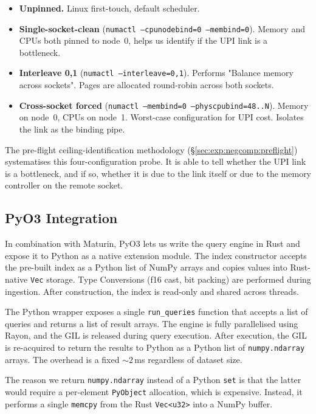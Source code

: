 \begin{itemize}
    \item \textbf{Unpinned.} Linux first-touch, default scheduler.
    \item \textbf{Single-socket-clean} (\texttt{numactl --cpunodebind=0 --membind=0}). Memory and CPUs both pinned to node~0, helps us identify if the UPI link is a bottleneck.
    \item \textbf{Interleave 0,1} (\texttt{numactl --interleave=0,1}). Performs "Balance memory across sockets". Pages are allocated round-robin across both sockets. 
    \item \textbf{Cross-socket forced} (\texttt{numactl --membind=0 --physcpubind=48..N}). Memory on node~0, CPUs on node~1. Worst-case configuration for UPI cost. Isolates the link as the binding pipe.
\end{itemize}

The pre-flight ceiling-identification methodology (§\ref{sec:exp:negcomp:preflight}) systematises this four-configuration probe. It is able to tell whether the UPI link is a bottleneck, and if so, whether it is due to the link itself or due to the memory controller on the remote socket.


\subsection{PyO3 Integration\label{sec:method:impl:pyo3}}

In combination with Maturin, PyO3 lets us write the query engine in Rust and expose it to Python as a native extension module. The index constructor accepts the pre-built index as a Python list of NumPy arrays and copies values into Rust-native \texttt{Vec} storage. Type Conversions (f16 cast, bit packing) are performed during ingestion. After construction, the index is read-only and shared across threads.

The Python wrapper exposes a single \texttt{run\_queries} function that accepts a list of queries and returns a list of result arrays. The engine is fully parallelised using Rayon, and the GIL is released during query execution. After execution, the GIL is re-acquired to return the results to Python as a Python list of \texttt{numpy.ndarray} arrays. The overhead is a fixed $\sim\!2$\,ms regardless of dataset size.

The reason we return \texttt{numpy.ndarray} instead of a Python \texttt{set} is that the latter would require a per-element \texttt{PyObject} allocation, which is expensive. Instead, it performs a single \texttt{memcpy} from the Rust \texttt{Vec<u32>} into a NumPy buffer.

